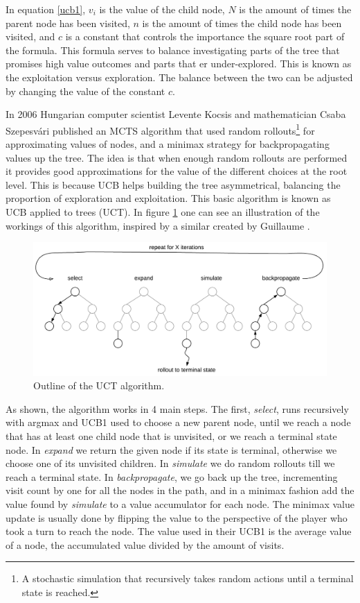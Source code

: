 In equation \ref{ucb1}, $v_i$ is the value of the child node, $N$ is the amount of times the parent node has been visited, $n$ is the amount of times the child node has been visited, and $c$ is a constant that controls the importance the square root part of the formula. This formula serves to balance investigating parts of the tree that promises high value outcomes and parts that er under-explored. This is known as the exploitation versus exploration. The balance between the two can be adjusted by changing the value of the constant $c$.

In 2006 Hungarian computer scientist Levente Kocsis and mathematician Csaba Szepesvári published an MCTS algorithm that used random rollouts\footnote{A stochastic simulation that recursively takes random actions until a terminal state is reached.} for approximating values of nodes, and a minimax strategy for backpropagating values up the tree. The idea is that when enough random rollouts are performed it provides good approximations for the value of the different choices at the root level. This is because UCB helps building the tree asymmetrical, balancing the proportion of exploration and exploitation. This basic algorithm is known as UCB applied to trees (UCT)\cite{Kocsis2006}. In figure \ref{fig-uct} one can see an illustration of the workings of this algorithm, inspired by a similar created by Guillaume \citeauthor{Chaslot2008}\cite{Chaslot2008}.

\begin{figure}[ht]
	\centering
	\includegraphics[width=1\textwidth]{figures/uct}
	\caption{Outline of the UCT algorithm.}
	\label{fig-uct}
\end{figure}

As shown, the algorithm works in 4 main steps. The first, \textit{select}, runs recursively with argmax and UCB1 used to choose a new parent node, until we reach a node that has at least one child node that is unvisited, or we reach a terminal state node. In \textit{expand} we return the given node if its state is terminal, otherwise we choose one of its unvisited children. In \textit{simulate} we do random rollouts till we reach a terminal state. In \textit{backpropagate}, we go back up the tree, incrementing visit count by one for all the nodes in the path, and in a minimax fashion add the value found by \textit{simulate} to a value accumulator for each node. The minimax value update is usually done by flipping the value to the perspective of the player who took a turn to reach the node. The value used in their UCB1 is the average value of a node, the accumulated value divided by the amount of visits\cite{Kocsis2006}.

